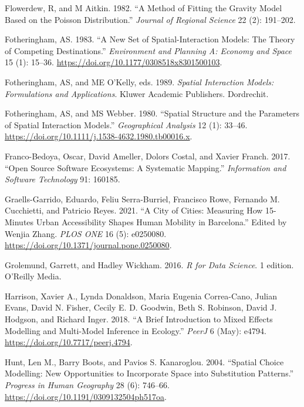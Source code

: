\documentclass[11pt,letterpaper]{article}
\newlength{\cslhangindent}
\newlength{\cslentryspacingunit} %
\newenvironment{CSLReferences}[2] %
 {%
  \setlength{\parindent}{0pt}
  \ifodd #1
  \let\oldpar\par
  \def\par{\hangindent=\cslhangindent\oldpar}
  \fi
  \setlength{\parskip}{#2\cslentryspacingunit}
 }%
 {}
\begin{document}
\begin{CSLReferences}{1}{0}
\leavevmode{}%
Flowerdew, R, and M Aitkin. 1982. {``A Method of Fitting the Gravity Model Based on the {Poisson} Distribution.''} \emph{Journal of Regional Science} 22 (2): 191--202.

\leavevmode{}%
Fotheringham, AS. 1983. {``A New Set of Spatial-Interaction Models: The Theory of Competing Destinations.''} \emph{Environment and Planning A: Economy and Space} 15 (1): 15--36. \url{https://doi.org/10.1177/0308518x8301500103}.

\leavevmode{}%
Fotheringham, AS, and ME O'Kelly, eds. 1989. \emph{Spatial Interaction Models: Formulations and Applications}. Kluwer Academic Publishers. Dordrechit.

\leavevmode{}%
Fotheringham, AS, and MS Webber. 1980. {``Spatial {Structure} and the {Parameters} of {Spatial} {Interaction} {Models}.''} \emph{Geographical Analysis} 12 (1): 33--46. \url{https://doi.org/10.1111/j.1538-4632.1980.tb00016.x}.

\leavevmode{}%
Franco-Bedoya, Oscar, David Ameller, Dolors Costal, and Xavier Franch. 2017. {``Open Source Software Ecosystems: A Systematic Mapping.''} \emph{Information and Software Technology} 91: 160185.

\leavevmode{}%
Graells-Garrido, Eduardo, Feliu Serra-Burriel, Francisco Rowe, Fernando M. Cucchietti, and Patricio Reyes. 2021. {``A City of Cities: Measuring How 15-Minutes Urban Accessibility Shapes Human Mobility in Barcelona.''} Edited by Wenjia Zhang. \emph{PLOS ONE} 16 (5): e0250080. \url{https://doi.org/10.1371/journal.pone.0250080}.

\leavevmode{}%
Grolemund, Garrett, and Hadley Wickham. 2016. \emph{R for Data Science}. 1 edition. O'Reilly Media.

\leavevmode{}%
Harrison, Xavier A., Lynda Donaldson, Maria Eugenia Correa-Cano, Julian Evans, David N. Fisher, Cecily E. D. Goodwin, Beth S. Robinson, David J. Hodgson, and Richard Inger. 2018. {``A Brief Introduction to Mixed Effects Modelling and Multi-Model Inference in Ecology.''} \emph{PeerJ} 6 (May): e4794. \url{https://doi.org/10.7717/peerj.4794}.

\leavevmode{}%
Hunt, Len M., Barry Boots, and Pavios S. Kanaroglou. 2004. {``Spatial Choice Modelling: New Opportunities to Incorporate Space into Substitution Patterns.''} \emph{Progress in Human Geography} 28 (6): 746--66. \url{https://doi.org/10.1191/0309132504ph517oa}.


\end{CSLReferences}
\end{document}
